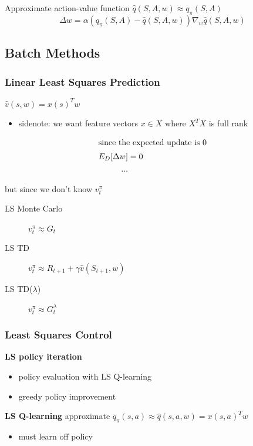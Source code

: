 \documentclass[]{article}
\theoremstyle{definition}
\begin{document}
Approximate action-value function $\hat q(S, A, w) \approx q_\pi(S,A)$
\begin{equation*}
    \Delta w = \alpha(q_\pi(S,A) - \hat q(S,A,w))\nabla_w \hat q(S, A, w)
\end{equation*}




\subsection{Batch Methods}%
\label{sub:batch_methods}

\subsubsection{Linear Least Squares Prediction}%
\label{ssub:linear_least_squares_prediction}

$\hat v(s,w) = x(s)^Tw$
\begin{itemize}
    \item sidenote: we want feature vectors $x \in X$ where $X^TX$ is full rank
\end{itemize}

\begin{align*}
    \intertext{since the expected update is 0}
    E_D[\Delta w] &= 0 \\
    ...
\end{align*}

but since we don't know $v^\pi_t$
\begin{description}
    \item[LS Monte Carlo] $v^\pi_t \approx G_t$
    \item[LS TD] $v^\pi_t \approx R_{t+1} + \gamma \hat v(S_{t+1},w)$
    \item[LS TD($\lambda$)] $v^\pi_t \approx G_t^\lambda$
\end{description}

\subsubsection{Least Squares Control}%
\label{ssub:least_squares_control}
\textbf{LS policy iteration}
\begin{itemize}
    \item policy evaluation with LS Q-learning
    \item greedy policy improvement
\end{itemize}
\textbf{LS Q-learning} approximate $q_\pi(s,a) \approx \hat q(s,a,w) = x(s,a)^T w$
\begin{itemize}
    \item must learn off policy
\end{itemize}
\end{document}
